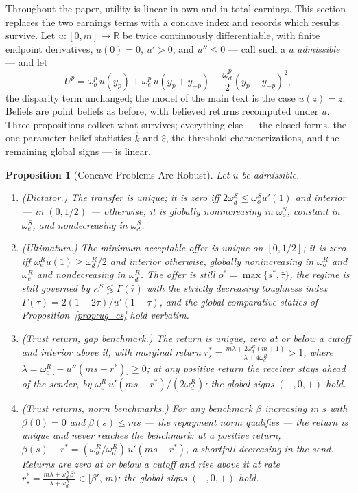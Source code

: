 \documentclass[11pt]{article}
\theoremstyle{plain}
\newtheorem{proposition}{Proposition}
\theoremstyle{remark}
\newcommand{\R}{\mathbb R}
\begin{document}
Throughout the paper, utility is linear in own and in total earnings.  This section replaces the two earnings terms with a concave index and records which results survive.  Let $u:[0,m]\to\R$ be twice continuously differentiable, with finite endpoint derivatives, $u(0)=0$, $u'>0$, and $u''\le0$ --- call such a $u$ \emph{admissible} --- and let
\[
        U^p
        =
        \omega_o^p\,u(y_p)
        +\omega_e^p\,u(y_p+y_{-p})
        -\frac{\omega_d^p}{2}(y_p-y_{-p})^2,
\]
the disparity term unchanged; the model of the main text is the case $u(z)=z$.  Beliefs are point beliefs as before, with believed returns recomputed under $u$.  Three propositions collect what survives; everything else --- the closed forms, the one-parameter belief statistics $\hat k$ and $\hat c$, the threshold characterizations, and the remaining global signs --- is linear.

\begin{proposition}[Concave Problems Are Robust]
\label{prop:robust_concave}
Let $u$ be admissible.
\begin{enumerate}[topsep=2pt,itemsep=2pt]
\item \emph{(Dictator.)}  The transfer is unique; it is zero iff $2\omega_d^S\le\omega_o^S u'(1)$ and interior --- in $(0,1/2)$ --- otherwise; it is globally nonincreasing in $\omega_o^S$, constant in $\omega_e^S$, and nondecreasing in $\omega_d^S$.
\item \emph{(Ultimatum.)}  The minimum acceptable offer is unique on $[0,1/2]$; it is zero iff $\omega_e^R u(1)\ge\omega_d^R/2$ and interior otherwise, globally nonincreasing in $\omega_o^R$ and $\omega_e^R$ and nondecreasing in $\omega_d^R$.  The offer is still $o^\ast=\max\{s^\ast,\hat\tau\}$, the regime is still governed by $\kappa^S\lessgtr\Gamma(\hat\tau)$ with the strictly decreasing toughness index $\Gamma(\tau)=2(1-2\tau)/u'(1-\tau)$, and the global comparative statics of Proposition~\ref{prop:ug_cs} hold verbatim.
\item \emph{(Trust return, gap benchmark.)}  The return is unique, zero at or below a cutoff and interior above it, with marginal return $r_s^\ast=\frac{m\lambda+2\omega_d^R(m+1)}{\lambda+4\omega_d^R}>1$, where $\lambda=\omega_o^R\big[-u''(ms-r^\ast)\big]\ge0$; at any positive return the receiver stays ahead of the sender, by $\omega_o^R\,u'(ms-r^\ast)/(2\omega_d^R)$; the global signs $(-,0,+)$ hold.
\item \emph{(Trust returns, norm benchmarks.)}  For any benchmark $\beta$ increasing in $s$ with $\beta(0)=0$ and $\beta(s)\le ms$ --- the repayment norm qualifies --- the return is unique and never reaches the benchmark: at a positive return, $\beta(s)-r^\ast=(\omega_o^R/\omega_d^R)\,u'(ms-r^\ast)$, a shortfall decreasing in the send.  Returns are zero at or below a cutoff and rise above it at rate $r_s^\ast=\frac{m\lambda+\omega_d^R\beta'}{\lambda+\omega_d^R}\in[\beta',\,m)$; the global signs $(-,0,+)$ hold.
\end{enumerate}
\end{proposition}
\end{document}
